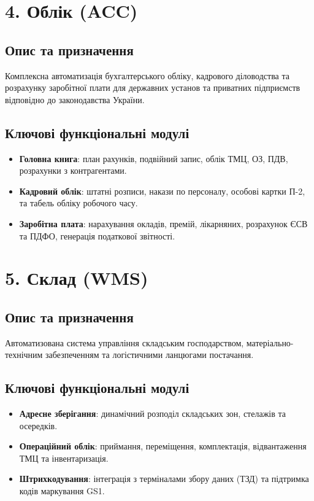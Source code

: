 \section{4. Облік (ACC)}
\subsection{Опис та призначення}
Комплексна автоматизація бухгалтерського обліку, кадрового діловодства та розрахунку заробітної плати для державних установ та приватних підприємств відповідно до законодавства України.
\subsection{Ключові функціональні модулі}
\begin{itemize}
    \item \textbf{Головна книга}: план рахунків, подвійний запис, облік ТМЦ, ОЗ, ПДВ, розрахунки з контрагентами.
    \item \textbf{Кадровий облік}: штатні розписи, накази по персоналу, особові картки П-2, та табель обліку робочого часу.
    \item \textbf{Заробітна плата}: нарахування окладів, премій, лікарняних, розрахунок ЄСВ та ПДФО, генерація податкової звітності.
\end{itemize}

\section{5. Склад (WMS)}
\subsection{Опис та призначення}
Автоматизована система управління складським господарством, матеріально-технічним забезпеченням та логістичними ланцюгами постачання.
\subsection{Ключові функціональні модулі}
\begin{itemize}
    \item \textbf{Адресне зберігання}: динамічний розподіл складських зон, стелажів та осередків.
    \item \textbf{Операційний облік}: приймання, переміщення, комплектація, відвантаження ТМЦ та інвентаризація.
    \item \textbf{Штрихкодування}: інтеграція з терміналами збору даних (ТЗД) та підтримка кодів маркування GS1.
\end{itemize}


